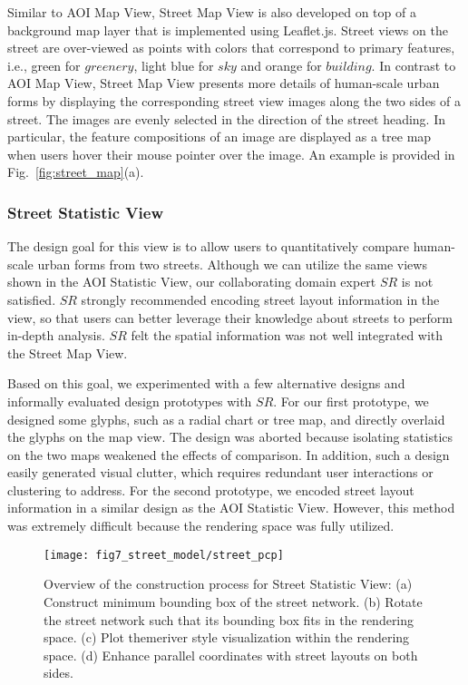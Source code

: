 Similar to AOI Map View, Street Map View is also developed on top of a background map layer that is implemented using Leaflet.js.
Street views on the street are over-viewed as points with colors that correspond to primary features, i.e., green for $greenery$, light blue for $sky$ and orange for $building$.
In contrast to AOI Map View, Street Map View presents more details of human-scale urban forms by displaying the corresponding street view images along the two sides of a street.
The images are evenly selected in the direction of the street heading. 
In particular, the feature compositions of an image are displayed as a tree map~\cite{shneiderman_1992_tree} when users hover their mouse pointer over the image.
An example is provided in Fig.~\ref{fig:street_map}(a).


\subsubsection{Street Statistic View}
\label{sssec:street_stat_view}

The design goal for this view is to allow users to quantitatively compare human-scale urban forms from two streets.
Although we can utilize the same views shown in the AOI Statistic View, our collaborating domain expert $SR$ is not satisfied.
$SR$ strongly recommended encoding street layout information in the view, so that users can better leverage their knowledge about streets to perform in-depth analysis.
$SR$ felt the spatial information was not well integrated with the Street Map View.

Based on this goal, we experimented with a few alternative designs and informally evaluated design prototypes with $SR$.
For our first prototype, we designed some glyphs, such as a radial chart or tree map, and directly overlaid the glyphs on the map view.
The design was aborted because isolating statistics on the two maps weakened the effects of comparison.
In addition, such a design easily generated visual clutter, which requires redundant user interactions or clustering to address.
For the second prototype, we encoded street layout information in a similar design as the AOI Statistic View.
However, this method was extremely difficult because the rendering space was fully utilized. 

\begin{figure}[t]
	\centering
	\texttt{[image: fig7\_street\_model/street\_pcp]}
	\vspace{-5mm}
	\caption{Overview of the construction process for Street Statistic View:
	(a) Construct minimum bounding box of the street network.
	(b) Rotate the street network such that its bounding box fits in the rendering space.
	(c) Plot themeriver style visualization within the rendering space.
	(d) Enhance parallel coordinates with street layouts on both sides.}
	\label{fig:street_statistic_view}
	\vspace{-6mm}
\end{figure}

